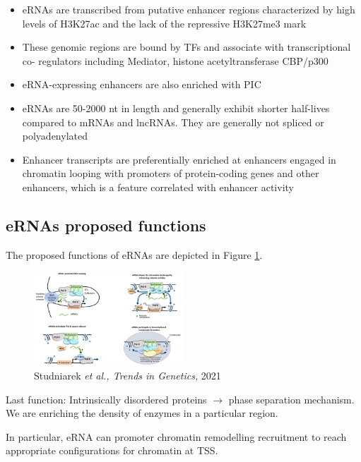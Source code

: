 \begin{itemize}
\tightlist
\item
  eRNAs are transcribed from putative enhancer regions characterized by high levels of H3K27ac and the lack of the repressive H3K27me3 mark
\item
  These genomic regions are bound by TFs and associate with transcriptional co- regulators including Mediator, histone acetyltransferase CBP/p300
\item
  eRNA-expressing enhancers are also enriched with PIC
\item
  eRNAs are 50-2000 nt in length and generally exhibit shorter half-lives compared to
  mRNAs and lncRNAs. They are generally not spliced or polyadenylated
\item
  Enhancer transcripts are preferentially enriched at enhancers engaged in chromatin looping with promoters of protein-coding genes and other enhancers, which is a feature correlated with enhancer activity
\end{itemize}

\hypertarget{ernas-proposed-functions}{%
\subsection{eRNAs proposed functions}\label{ernas-proposed-functions}}

The proposed functions of eRNAs are depicted in Figure \ref{fig:functions}.
\begin{figure}
\centering
\includegraphics[width=0.5\textwidth]{../_resources/Screenshot_2022-10-12_at_10-00-02.png}
\caption{Studniarek \emph{et al., Trends in Genetics,} 2021}
\label{fig:functions}
\end{figure}

Last function: Intrinsically disordered proteins $\rightarrow$ phase separation mechanism. We are enriching the density of enzymes in a particular region.

In particular, eRNA can promoter chromatin remodelling recruitment to reach appropriate configurations for chromatin at TSS.

